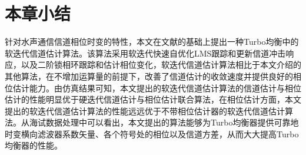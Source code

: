 \section{本章小结}
针对水声通信信道相位时变的特性，本文在文献的基础上提出一种Turbo均衡中的软迭代信道估计算法。该算法采用软迭代快速自优化LMS跟踪和更新信道冲击响应，以及二阶锁相环跟踪和估计相位变化，软迭代信道估计算法相比于本文介绍的其他算法，在不增加运算量的前提下，改善了信道估计的收敛速度并提供良好的相位估计能力。由仿真结果可知，本文提出的软迭代信道估计算法的信道估计与相位估计的性能明显优于硬迭代信道估计与相位估计联合算法，在相位估计方面，本文提出的软迭代信道估计算法的性能远远优于不带相位估计器的软迭代信道估计算法。从海试数据处理中可以看出，本文提出的算法能够为Turbo均衡器提供可靠地时变横向滤波器系数矢量、各个符号处的相位以及信道方差，从而大大提高Turbo均衡器的性能。
%
